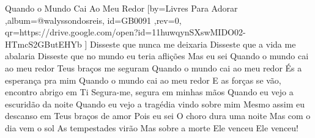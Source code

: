 \beginsong
{Quando o Mundo Cai Ao Meu Redor %
}[by={Livres Para Adorar %
},album={@walyssondosreis},
id={GB0091 %
},rev={0}, %
qr={https://drive.google.com/open?id=11huwqynSXswMIDO02-HTmcS2GButEHYb %
}]
\beginverse*
Disseste que nunca me deixaria
Disseste que a vida me abalaria
Disseste que no mundo eu teria aflições
Mas eu sei
\endverse
\beginchorus
Quando o mundo cai ao meu redor
Teus braços me seguram
Quando o mundo cai ao meu redor
És a esperança pra mim
Quando o mundo cai ao meu redor
E as forças se vão, encontro abrigo em Ti
Segura-me, segura em minhas mãos
\endchorus
\beginverse*
Quando eu vejo a escuridão da noite
Quando eu vejo a tragédia vindo sobre mim
Mesmo assim eu descanso em Teus braços de amor
Pois eu sei
\endverse
\beginverse*
O choro dura uma noite
Mas com o dia vem o sol
As tempestades virão
Mas sobre a morte Ele venceu
Ele venceu!
\endverse

